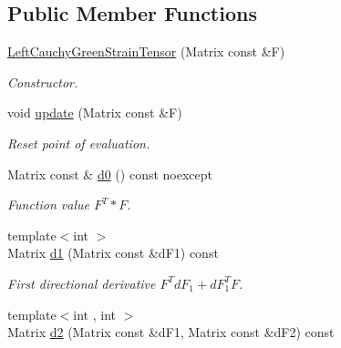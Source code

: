 \subsection*{Public Member Functions}
\begin{DoxyCompactItemize}
\item 
\hyperlink{classFunG_1_1LinearAlgebra_1_1LeftCauchyGreenStrainTensor_a6bfc0f686be29024dc740630f364d051}{Left\-Cauchy\-Green\-Strain\-Tensor} (Matrix const \&F)
\begin{DoxyCompactList}\small\item\em Constructor. \end{DoxyCompactList}\item 
\hypertarget{classFunG_1_1LinearAlgebra_1_1LeftCauchyGreenStrainTensor_a3ab24c88bf4e9f9240dee4544027c238}{void \hyperlink{classFunG_1_1LinearAlgebra_1_1LeftCauchyGreenStrainTensor_a3ab24c88bf4e9f9240dee4544027c238}{update} (Matrix const \&F)}\label{classFunG_1_1LinearAlgebra_1_1LeftCauchyGreenStrainTensor_a3ab24c88bf4e9f9240dee4544027c238}

\begin{DoxyCompactList}\small\item\em Reset point of evaluation. \end{DoxyCompactList}\item 
\hypertarget{classFunG_1_1LinearAlgebra_1_1LeftCauchyGreenStrainTensor_a541f165ca20f61eeae1b5cf2d6bc42c6}{Matrix const \& \hyperlink{classFunG_1_1LinearAlgebra_1_1LeftCauchyGreenStrainTensor_a541f165ca20f61eeae1b5cf2d6bc42c6}{d0} () const noexcept}\label{classFunG_1_1LinearAlgebra_1_1LeftCauchyGreenStrainTensor_a541f165ca20f61eeae1b5cf2d6bc42c6}

\begin{DoxyCompactList}\small\item\em Function value $ F^T * F $. \end{DoxyCompactList}\item 
\hypertarget{classFunG_1_1LinearAlgebra_1_1LeftCauchyGreenStrainTensor_ae61332db7d9941efd055273c6f00af6f}{{\footnotesize template$<$int $>$ }\\Matrix \hyperlink{classFunG_1_1LinearAlgebra_1_1LeftCauchyGreenStrainTensor_ae61332db7d9941efd055273c6f00af6f}{d1} (Matrix const \&d\-F1) const }\label{classFunG_1_1LinearAlgebra_1_1LeftCauchyGreenStrainTensor_ae61332db7d9941efd055273c6f00af6f}

\begin{DoxyCompactList}\small\item\em First directional derivative $ F^T dF_1 + dF_1^T F $. \end{DoxyCompactList}\item 
\hypertarget{classFunG_1_1LinearAlgebra_1_1LeftCauchyGreenStrainTensor_a5ad1ba43d88d878f5236b55d86bddb11}{{\footnotesize template$<$int , int $>$ }\\Matrix \hyperlink{classFunG_1_1LinearAlgebra_1_1LeftCauchyGreenStrainTensor_a5ad1ba43d88d878f5236b55d86bddb11}{d2} (Matrix const \&d\-F1, Matrix const \&d\-F2) const }\label{classFunG_1_1LinearAlgebra_1_1LeftCauchyGreenStrainTensor_a5ad1ba43d88d878f5236b55d86bddb11}


\end{DoxyCompactItemize}
